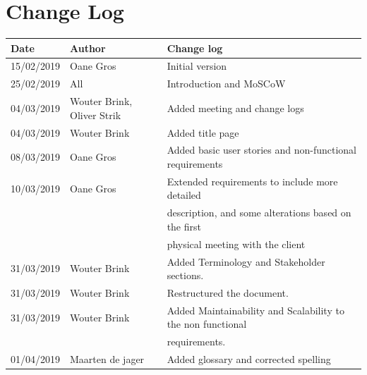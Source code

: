 \documentclass{article}
\begin{document}
\section{Change Log}
\begin{center}
 \begin{tabular}{ | l | l | l | }
  \hline
  \bf{Date} & \bf{Author} & \bf{Change log} \\
  \hline
  15/02/2019 & Oane Gros & Initial version \\
  \hline
  25/02/2019 & All & Introduction and MoSCoW \\
  \hline
  04/03/2019 & Wouter Brink, Oliver Strik & Added meeting and change logs\\
  \hline
  04/03/2019 & Wouter Brink & Added title page \\
  \hline
  08/03/2019 & Oane Gros & Added basic user stories and non-functional requirements \\
  \hline
  10/03/2019 & Oane Gros & Extended requirements to include more detailed \\  & & description,
   and some alterations based on the first \\ & & physical meeting with the client \\
  \hline
  31/03/2019 & Wouter Brink & Added Terminology and Stakeholder sections. \\
  \hline
  31/03/2019 & Wouter Brink & Restructured the document. \\
  \hline
  31/03/2019 & Wouter Brink & Added Maintainability and Scalability to the non functional \\
  & & requirements. \\
  \hline
  01/04/2019 & Maarten de jager & Added glossary and corrected spelling \\
  \hline
 \end{tabular}
\end{center}
\end{document}
